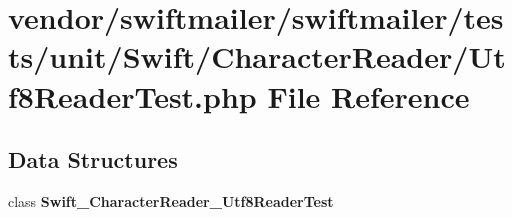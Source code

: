 \section{vendor/swiftmailer/swiftmailer/tests/unit/\+Swift/\+Character\+Reader/\+Utf8\+Reader\+Test.php File Reference}
\label{_utf8_reader_test_8php}
\subsection*{Data Structures}
\begin{DoxyCompactItemize}
\item 
class {\bf Swift\+\_\+\+Character\+Reader\+\_\+\+Utf8\+Reader\+Test}
\end{DoxyCompactItemize}
